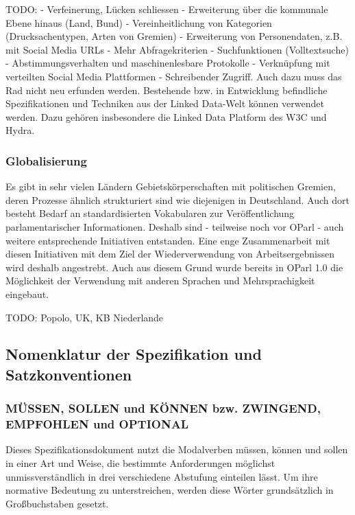 \documentclass[,a4paper]{article}
\begin{document}
TODO: - Verfeinerung, Lücken schliessen - Erweiterung über die kommunale
Ebene hinaus (Land, Bund) - Vereinheitlichung von Kategorien
(Drucksachentypen, Arten von Gremien) - Erweiterung von Personendaten,
z.B. mit Social Media URLs - Mehr Abfragekriterien - Suchfunktionen
(Volltextsuche) - Abstimmungsverhalten und maschinenlesbare Protokolle -
Verknüpfung mit verteilten Social Media Plattformen - Schreibender
Zugriff. Auch dazu muss das Rad nicht neu erfunden werden. Bestehende
bzw. in Entwicklung befindliche Spezifikationen und Techniken aus der
Linked Data-Welt können verwendet werden. Dazu gehören insbesondere die
Linked Data Platform des W3C und Hydra.

\subsubsection{Globalisierung}\label{globalisierung}

Es gibt in sehr vielen Ländern Gebietskörperschaften mit politischen
Gremien, deren Prozesse ähnlich strukturiert sind wie diejenigen in
Deutschland. Auch dort besteht Bedarf an standardisierten Vokabularen
zur Veröffentlichung parlamentarischer Informationen. Deshalb sind -
teilweise noch vor OParl - auch weitere entsprechende Initiativen
entstanden. Eine enge Zusammenarbeit mit diesen Initiativen mit dem Ziel
der Wiederverwendung von Arbeitsergebnissen wird deshalb angestrebt.
Auch aus diesem Grund wurde bereits in OParl 1.0 die Möglichkeit der
Verwendung mit anderen Sprachen und Mehrsprachigkeit eingebaut.

TODO: Popolo, UK, KB Niederlande

\subsection{Nomenklatur der Spezifikation und
Satzkonventionen}\label{nomenklatur-der-spezifikation-und-satzkonventionen}

\subsubsection{MÜSSEN, SOLLEN und KÖNNEN bzw. ZWINGEND, EMPFOHLEN und
OPTIONAL}\label{muxfcssen-sollen-und-kuxf6nnen-bzw.-zwingend-empfohlen-und-optional}

Dieses Spezifikationsdokument nutzt die Modalverben müssen, können und
sollen in einer Art und Weise, die bestimmte Anforderungen möglichst
unmissverständlich in drei verschiedene Abstufung einteilen lässt. Um
ihre normative Bedeutung zu unterstreichen, werden diese Wörter
grundsätzlich in Großbuchstaben gesetzt.
\end{document}
